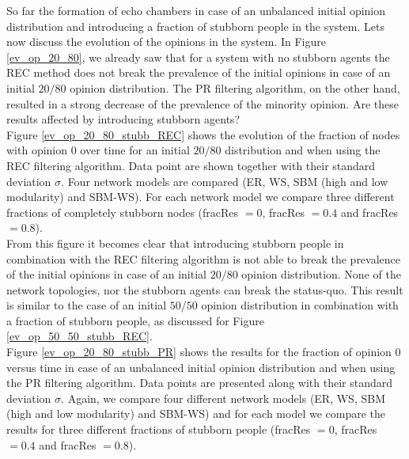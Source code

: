 \documentclass[11 pt , letterpaper , twoside , openright]{book}
\begin{document}
\newline
So far the formation of echo chambers in case of an unbalanced initial opinion distribution and introducing a fraction of stubborn people in the system. Lets now discuss the evolution of the opinions in the system. In Figure \ref{ev_op_20_80}, we already saw that for a system with no stubborn agents the REC method does not break the prevalence of the initial opinions in case of an initial $20/80$ opinion distribution. The PR filtering algorithm, on the other hand, resulted in a strong decrease of the prevalence of the minority opinion. Are these results affected by introducing stubborn agents?\\
\newline
Figure \ref{ev_op_20_80_stubb_REC} shows the evolution of the fraction of nodes with opinion 0 over time for an initial $20/80$ distribution and when using the REC filtering algorithm. Data point are shown together with their standard deviation $\sigma$. Four network models are compared (ER, WS, SBM (high and low modularity) and SBM-WS). For each network model we compare three different fractions of completely stubborn nodes (fracRes $=0$, fracRes $=0.4$ and fracRes $=0.8$). \\
From this figure it becomes clear that introducing stubborn people in combination with the REC filtering algorithm is not able to break the prevalence of the initial opinions in case of an initial $20/80$ opinion distribution. None of the network topologies, nor the stubborn agents can break the status-quo. This result is similar to the case of an initial $50/50$ opinion distribution in combination with a fraction of stubborn people, as discussed for Figure \ref{ev_op_50_50_stubb_REC}.\\
\newline
Figure \ref{ev_op_20_80_stubb_PR} shows the results for the fraction of opinion 0 versus time in case of an unbalanced initial opinion distribution and when using the PR filtering algorithm. Data points are presented along with their standard deviation $\sigma$. Again, we compare four different network models (ER, WS, SBM (high and low modularity) and SBM-WS) and for each model we compare the results for three different fractions of stubborn people (fracRes $=0$, fracRes $=0.4$ and fracRes $=0.8$). \\
\end{document}
